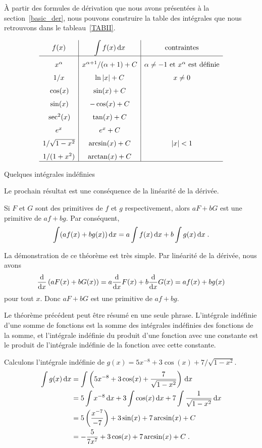 {À partir des formules de dérivation que nous avons présentées à la
section~\ref{basic_der}, nous pouvons construire la table des intégrales
que nous retrouvons dans le tableau~\ref{TABII}.

\begin{table}
\[
\begin{array}{c|c|cl}
f(x) & \displaystyle \int f(x)\dx{x} & \text{contraintes} \\
\hline
\rule{0em}{1.5em} x^\alpha & x^{\alpha+1}/(\alpha+1) + C &
\alpha \neq -1 \ \text{et}\ x^\alpha\ \text{est définie} \\ 
\rule{0em}{1.5em} 1/x & \ln|x| + C & x \neq 0 \\
\rule{0em}{1.5em} \cos(x) & \sin(x) + C & \\
\rule{0em}{1.5em} \sin(x) & -\cos(x) + C & \\
\rule{0em}{1.5em} \sec^2(x) & \tan(x) + C & \\
\rule{0em}{1.5em} e^x & e^x + C & \\
\rule{0em}{1.5em} 1/\sqrt{1-x^2} & \arcsin(x) + C & |x|<1 \\
\rule{0em}{1.5em} 1/(1+x^2) & \arctan(x) + C & \\
\hline
\end{array}
\]
\caption{Quelques intégrales indéfinies \label{TABII}}
\end{table}

Le prochain résultat est une conséquence de la linéarité de la
dérivée.

\begin{focus}{\thm}
Si $F$ et $G$ sont des primitives de $f$ et $g$ respectivement, alors
$a F + b G$ est une primitive de $a f + b g$.  Par conséquent,
\[
\int (a f(x) + b g(x)) \dx{x} = a \int f(x) \dx{x}
+ b \int g(x) \dx{x} \; .
\]
\end{focus}

La démonstration de ce théorème est très simple.  Par linéarité de la
dérivée, nous avons
\[
\dfdx{\left(a F(x) + b G(x)\right)}{x}
= a \dfdx{F(x)}{x} + b \dfdx{G(x)}{x}
= a f(x) + b g(x)
\]
pour tout $x$.  Donc $aF+bG$ est une primitive de $af + bg$.  

Le théorème précédent peut être résumé en une seule phrase.
L'intégrale indéfinie d'une somme de fonctions est la somme des
intégrales indéfinies des fonctions de la somme, et l'intégrale
indéfinie du produit d'une fonction avec une constante est le produit
de l'intégrale indéfinie de la fonction avec cette constante. 

\begin{egg}
Calculons l'intégrale indéfinie de
$g(x) = 5 x^{-8} + 3 \cos(x) + 7/\sqrt{1-x^2}$.
\begin{align*}
\int g(x)\dx{x} &=
\int \left(5 x^{-8} + 3 \cos(x) + \frac{7}{\sqrt{1-x^2}} \right)\dx{x} \\
&= 5 \int x^{-8} \dx{x} + 3 \int \cos(x)\dx{x}
+ 7 \int \frac{1}{\sqrt{1-x^2}}\dx{x}  \\
&= 5 \left( \frac{x^{-7}}{-7}\right) + 3 \sin(x) + 7 \arcsin(x) + C\\
&= -\frac{5}{7x^7} + 3\cos(x) + 7 \arcsin(x) + C \; .
\end{align*}
\end{egg}

}
